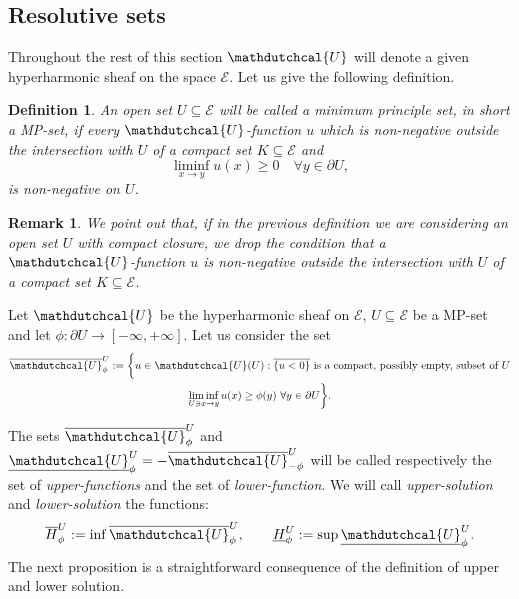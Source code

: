 \documentclass{amsart}
\newtheorem{defn}[thm]{Definition}
\newtheorem{rem}[thm]{Remark}
\numberwithin{equation}{section}
\def \p{{\phi}}
\def \Ec{{\mathcal{E}}}
\def \Ud{{\mathdutchcal{U}}}
\begin{document}
{\subsection{Resolutive sets}
Throughout the rest of this section $\Ud$ will denote a given hyperharmonic sheaf  on the space $\Ec$. Let us give the following definition.
\begin{defn}\label{mp-set}
An open set $U \subseteq \Ec$ will be called a \textup{minimum principle set}, in short a \textup{MP-set}, if every $\Ud$-function $u$ which is non-negative outside the intersection with $U$ of a compact set $K \subseteq \Ec$ and
\[
\liminf_{x \rightarrow y}u(x)\geq 0 \quad \forall y \in \partial U,
\]
is non-negative on $U$.
\end{defn}
\begin{rem}{\rm
We point out that, if in the previous definition we are considering an open set $U$ with compact closure, we drop the condition that a $\Ud$-function $u$ is non-negative outside the intersection with $U$ of a compact set $K \subseteq \Ec$.}
\end{rem}

Let $\Ud$ be the hyperharmonic sheaf on $\Ec$, $U \subseteq \Ec$ be a {MP}-set and let $\p: \partial U \rightarrow [-\infty,+\infty]$. Let us consider the set 
\begin{multline*}
\overline{\Ud}^U_\p  :=  \biggl\{u \in \Ud(U):   \overline{\{u < 0\}} \ \text{is a compact, possibly empty, subset of $U$}\\
  \liminf\limits_{U \ni x \rightarrow y}u(x) \geq \p(y) \ \forall y \in \partial U \biggr\}.
\end{multline*}

The sets $\overline{\Ud}^U_\p$ and $\underline{\Ud}^U_\p= - \overline{\Ud}^U_{-\p}$ will be called respectively the set of \textit{upper-functions} and the set of \textit{lower-function}. We will call \textit{upper-solution} and \textit{lower-solution} the functions:
$$
\overline{H}^U_\p :=\inf \overline{\Ud}^U_\p, \qquad \underline{H}^U_\p := \sup \underline{\Ud}^U_\p.
$$
The next proposition is a straightforward consequence of the definition of upper and lower solution.

}
\end{document}
